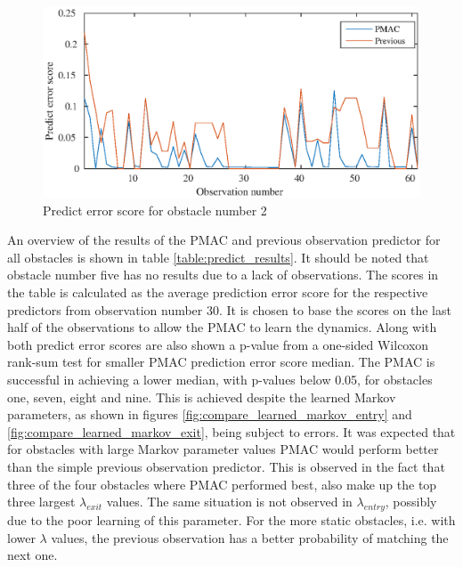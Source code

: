 \begin{figure}[htbp]
	\centering
	\includegraphics[scale=1]{chapters/evaluation/figures/markov_predict_figs/obstacle2_low.eps}
	\caption{Predict error score for obstacle number 2}
	\label{fig:markov_predict_obst_2}
\end{figure}%

An overview of the results of the PMAC and previous observation predictor for all obstacles is shown in table \ref{table:predict_results}. It should be noted that obstacle number five has no results due to a lack of observations. The scores in the table is calculated as the average prediction error score for the respective predictors from observation number 30. It is chosen to base the scores on the last half of the observations to allow the PMAC to learn the dynamics. Along with both predict error scores are also shown a p-value from a one-sided Wilcoxon rank-sum test for smaller PMAC prediction error score median. The PMAC is successful in achieving a lower median, with p-values below 0.05, for obstacles one, seven, eight and nine. This is achieved despite the learned Markov parameters, as shown in figures \ref{fig:compare_learned_markov_entry} and  \ref{fig:compare_learned_markov_exit}, being subject to errors. It was expected that for obstacles with large Markov parameter values PMAC would perform better than the simple previous observation predictor. This is observed in the fact that three of the four obstacles where PMAC performed best, also make up the top three largest \(\lambda_{exit}\) values. The same situation is not observed in \(\lambda_{entry}\), possibly due to the poor learning of this parameter. For the more static obstacles, i.e. with lower \(\lambda\) values, the previous observation has a better probability of matching the next one.

